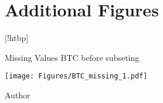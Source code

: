 \chapter{Additional Figures}

[!htbp]
    \begin{center}
    \caption{Missing Values BTC before subseting}
    \label{fig:btc_missing_1}
    \texttt{[image: Figures/BTC\_missing\_1.pdf]}
    \end{center}\vspace{-0.5cm}
    \begin{source}Author\end{source}
    